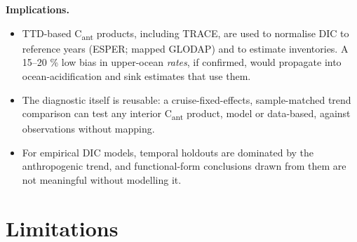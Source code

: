 \documentclass[11pt]{article}
\providecommand{\tightlist}{\setlength{\itemsep}{0pt}\setlength{\parskip}{0pt}}
\begin{document}
\textbf{Implications.}

\begin{itemize}
\tightlist
\item
  TTD-based C\textsubscript{ant} products, including TRACE, are used to
  normalise DIC to reference years (ESPER; mapped GLODAP) and to
  estimate inventories. A 15--20 \% low bias in upper-ocean
  \emph{rates}, if confirmed, would propagate into ocean-acidification
  and sink estimates that use them.
\item
  The diagnostic itself is reusable: a cruise-fixed-effects,
  sample-matched trend comparison can test any interior
  C\textsubscript{ant} product, model or data-based, against
  observations without mapping.
\item
  For empirical DIC models, temporal holdouts are dominated by the
  anthropogenic trend, and functional-form conclusions drawn from them
  are not meaningful without modelling it.
\end{itemize}

\section{Limitations}\label{limitations}
\end{document}
